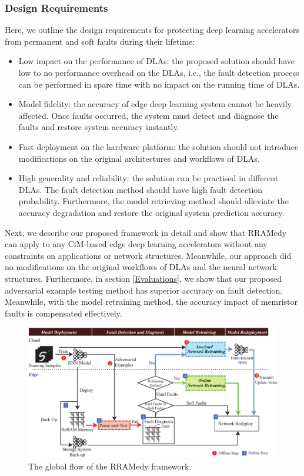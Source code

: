 \subsubsection{Design Requirements}
Here, we outline the design requirements for protecting deep learning accelerators from permanent and soft faults during their lifetime:
\begin{itemize}
    \item Low impact on the performance of DLAs: the proposed solution should have low to no performance overhead on the DLAs, i.e., the fault detection process can be performed in spare time with no impact on the running time of DLAs.

    \item Model fidelity: the accuracy of edge deep learning system cannot be heavily affected. Once faults occurred, the system must detect and diagnose the faults and restore system accuracy instantly.

    \item Fast deployment on the hardware platform: the solution should not introduce modifications on the original architectures and workflows of DLAs.

    \item High generality and reliability: the solution can be practised in different DLAs. The fault detection method should have high fault detection probability. Furthermore, the model retrieving method should alleviate the accuracy degradation and restore the original system prediction accuracy.

\end{itemize}

Next, we describe our proposed framework in detail and show that RRAMedy can apply to any CiM-based edge deep learning accelerators without any constraints on applications or network structures. Meanwhile, our approach did no  modifications on the original workflows of DLAs and the neural network structures. Furthermore, in section \ref{Evaluations}, we show that our proposed adversarial example testing method has superior accuracy on fault detection. Meanwhile, with the model retraining method, the accuracy impact of memristor faults is compensated effectively.  


\begin{figure}
    \centering
    \includegraphics[width=0.8\linewidth]{images/OL-fig3}
    \caption{The global flow of the RRAMedy framework.}
    \label{fig:overview}
    \vspace {-15pt}
\end{figure}

